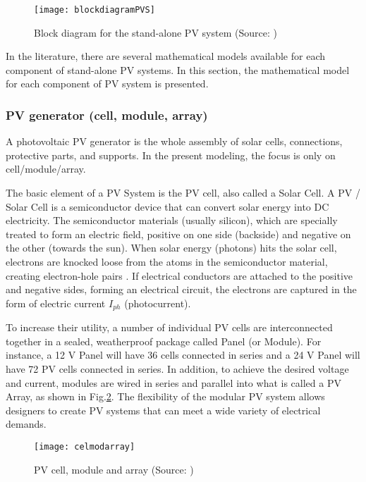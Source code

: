 \begin{figure}[h]
\texttt{[image: blockdiagramPVS]}
\centering
\caption{Block diagram for the stand-alone PV system (Source: \cite{Hansen})}
\label{fig:blockdiagram}
\end{figure}

In the literature, there are several mathematical models available for each component of stand-alone PV systems. In this section, the mathematical model for each component of PV system is presented. 

\subsubsection{PV generator (cell, module, array) }
A photovoltaic PV generator is the whole assembly of solar cells, connections, protective parts, and supports. In the present modeling, the focus is only on cell/module/array.
 
The basic element of a PV System is the PV cell, also called a Solar Cell. A PV / Solar Cell is a semiconductor device that can convert solar energy into DC electricity. The semiconductor materials (usually silicon), which are specially treated to form an electric field, positive on one side (backside) and negative on the other (towards the sun). When solar energy (photons) hits the solar cell, electrons are knocked loose from the atoms in the semiconductor material, creating electron-hole pairs \cite{Lorenzo}. If electrical conductors are attached to the positive and negative sides, forming an electrical circuit, the electrons are captured in the form of electric current $ I_{ph} $ (photocurrent).
 
To increase their utility, a number of individual PV cells are interconnected together in a sealed, weatherproof package called Panel (or Module). For instance, a 12 V Panel will have 36 cells connected in series and a 24 V Panel will have 72 PV cells connected in series. In addition, to achieve the desired voltage and current, modules are wired in series and parallel into what is called a PV Array, as shown in Fig.\ref{fig:celmodarray}. The flexibility of the modular PV system allows designers to create PV systems that can meet a wide variety of electrical demands. 

\begin{figure}[h]
\texttt{[image: celmodarray]}
\centering
\caption{PV cell, module and array (Source: \cite{SamlexSolar})}
\label{fig:celmodarray}
\end{figure}

